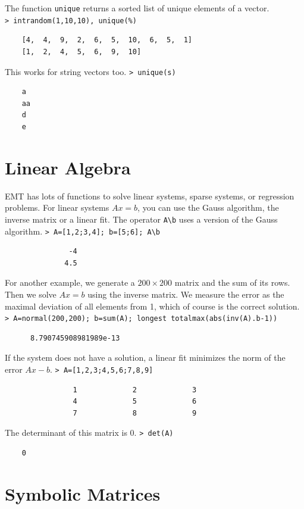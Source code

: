 \documentclass[11pt, a4paper]{article}
\newcommand{\emtcmd}[1]{\noindent\texttt{\textcolor{emtcommand}{>}\ #1}\par\smallskip}
\begin{document}
The function \texttt{unique} returns a sorted list of unique elements of a vector.
\emtcmd{intrandom(1,10,10), unique(\%)}
\begin{verbatim}
    [4,  4,  9,  2,  6,  5,  10,  6,  5,  1]
    [1,  2,  4,  5,  6,  9,  10]
\end{verbatim}

This works for string vectors too.
\emtcmd{unique(s)}
\begin{verbatim}
    a
    aa
    d
    e
\end{verbatim}

\section*{Linear Algebra}

EMT has lots of functions to solve linear systems, sparse systems, or regression problems. For linear systems $Ax=b$, you can use the Gauss algorithm, the inverse matrix or a linear fit. The operator \texttt{A\textbackslash b} uses a version of the Gauss algorithm.
\emtcmd{A=[1,2;3,4]; b=[5;6]; A\textbackslash b}
\begin{verbatim}
               -4
              4.5
\end{verbatim}

For another example, we generate a $200 \times 200$ matrix and the sum of its rows. Then we solve $Ax=b$ using the inverse matrix. We measure the error as the maximal deviation of all elements from 1, which of course is the correct solution.
\emtcmd{A=normal(200,200); b=sum(A); longest totalmax(abs(inv(A).b-1))}
\begin{verbatim}
      8.790745908981989e-13
\end{verbatim}

If the system does not have a solution, a linear fit minimizes the norm of the error $Ax-b$.
\emtcmd{A=[1,2,3;4,5,6;7,8,9]}
\begin{verbatim}
                1             2             3
                4             5             6
                7             8             9
\end{verbatim}

The determinant of this matrix is 0.
\emtcmd{det(A)}
\begin{verbatim}
    0
\end{verbatim}

\section*{Symbolic Matrices}
\end{document}
